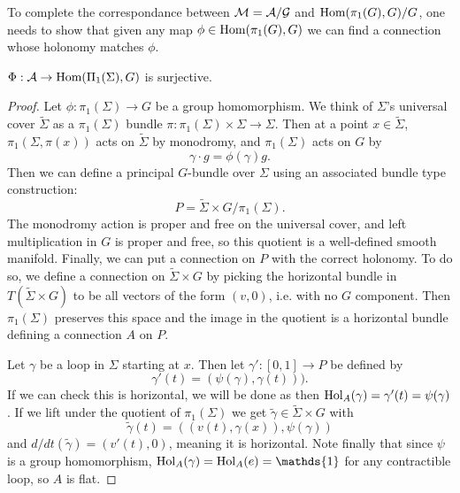 	To complete the correspondance between $\mathcal{M} = \mathcal{A}/\mathcal{G}$ and $\text{Hom}(\pi_1(G),G)/G$, one needs to show that given any map $\phi\in\text{Hom}(\pi_1(G),G)$ we can find a connection whose holonomy matches $\phi$.
	\begin{lemma}
			$\Phi:\mathcal{A} \to \text{Hom}(\Pi_1(\Sigma),G)$ is surjective.
	\end{lemma}
	\begin{proof}
		Let $\phi:\pi_1(\Sigma)\to G$ be a group homomorphism. We think of $\Sigma$'s universal cover $\tilde{\Sigma}$ as a $\pi_1(\Sigma)$ bundle $\pi:\pi_1(\Sigma)\times \Sigma \to \Sigma$. Then at a point $x\in \tilde{\Sigma}$, $\pi_1(\Sigma, \pi(x))$ acts on $\tilde{\Sigma}$ by monodromy, and $\pi_1(\Sigma)$ acts on $G$ by
		\begin{equation}
			\gamma \cdot g = \phi(\gamma) g.
		\end{equation}
		Then we can define a principal $G$-bundle over $\Sigma$ using an associated bundle type construction:
		\begin{equation}
			P = \tilde{\Sigma} \times G / \pi_1(\Sigma).
		\end{equation}
		The monodromy action is proper and free on the universal cover, and left multiplication in $G$ is proper and free, so this quotient is a well-defined smooth manifold. Finally, we can put a connection on $P$ with the correct holonomy. To do so, we define a connection on $\tilde{\Sigma}\times G$ by picking the horizontal bundle in $T(\tilde{\Sigma}\times G)$ to be all vectors of the form $(v, 0)$, i.e. with no $G$ component. Then $\pi_1(\Sigma)$ preserves this space and the image in the quotient is a horizontal bundle defining a connection $A$ on $P$. 
		
		Let $\gamma$ be a loop in $\Sigma$ starting at $x$. Then let $\gamma':[0,1]\to P$ be defined by
		\begin{equation}
			\gamma'(t) = (\psi(\gamma), \gamma(t))).
		\end{equation}
		If we can check this is horizontal, we will be done as then $\text{Hol}_A(\gamma) = \gamma'(t) = \psi(\gamma)$. If we lift under the quotient of $\pi_1(\Sigma)$ we get $\tilde{\gamma} \in \tilde{\Sigma}\times G$ with
		\begin{equation}
			\tilde{\gamma}(t) = ((v(t),\gamma(x)), \psi(\gamma))
		\end{equation}
		and $d/dt(\tilde{\gamma}) = (v'(t), 0)$, meaning it is horizontal. Note finally that since $\psi$ is a group homomorphism, $\Hol_A(\gamma) = \Hol_A(e) = \mathds{1}$ for any contractible loop, so $A$ is flat.
	\end{proof}
